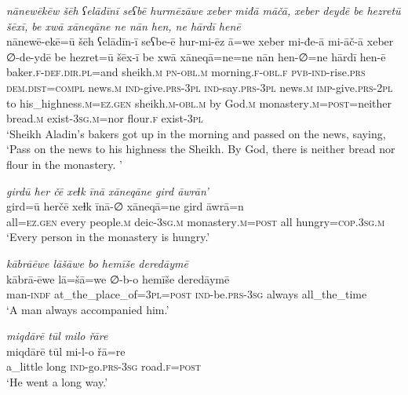 \ea \label{HB.2}
\textit{nānewēkēw šēh ʕelādīnī seʕbē hurmēzāwe xeber miđā māčā, xeber deydē be hezretū šēxī, be xwā xāneqāne ne nān hen, ne hārdī henē} \\ 
\gll nānewē-ekē=ū šēh ʕelādīn-ī seʕbe-ē hur-mi-ēz ā=we xeber mi-đe-ā mi-āč-ā xeber ∅-de-ydē be hezret=ū šēx-ī be xwā xāneqā=ne=ne nān hen-∅=ne hārdī hen-ē \\ 
 baker\textsc{\textsc{.f}}\textsc{-def}\textsc{.dir}\textsc{.pl}=and sheikh\textsc{.m} \textsc{pn}\textsc{-obl}\textsc{.m} morning\textsc{\textsc{.f}}\textsc{-obl}\textsc{\textsc{.f}} \textsc{pvb-}\textsc{ind-}rise\textsc{.prs} \textsc{dem.dist}\textsc{=compl} news\textsc{.m} \textsc{ind-}give\textsc{.prs}\textsc{-3pl} \textsc{ind-}say\textsc{.prs}\textsc{-3pl} news\textsc{.m} \textsc{imp-}give\textsc{.prs}\textsc{-2pl} to his\_highness\textsc{.m}\textsc{=ez}\textsc{.gen} sheikh\textsc{.m}\textsc{-obl}\textsc{.m} by God\textsc{.m} monastery\textsc{.m}\textsc{=\textsc{post}}=neither bread\textsc{.m} exist\textsc{-3sg}\textsc{.m}=nor flour\textsc{\textsc{.f}} exist\textsc{-3pl} \\ 
\glt `Sheikh Aladin’s bakers got up in the morning and passed on the news, saying, ‘Pass on the news to his highness the Sheikh. By God, there is neither bread nor flour in the monastery. '
\z 
 
\ea \label{HB.5}
\textit{girdū her čē xeɫk īnā xāneqāne gird āwrān’} \\ 
\gll gird=ū herčē xeɫk īnā-∅ xāneqā=ne gird āwrā=n \\ 
 all\textsc{=ez}\textsc{.gen} every people\textsc{.m} deic\textsc{-3sg}\textsc{.m} monastery\textsc{.m}\textsc{=\textsc{post}} all hungry\textsc{=cop}\textsc{.3sg}\textsc{.m} \\ 
\glt `Every person in the monastery is hungry.'
\z 
 
\ea \label{HB.7}
\textit{kābrāēwe lāšāwe bo hemīše deredāymē} \\ 
\gll kābrā-ēwe lā=šā=we ∅-b-o hemīše deredāymē \\ 
 man\textsc{-indf} at\_the\_place\_of\textsc{=3pl}\textsc{=\textsc{post}} \textsc{ind-}be\textsc{.prs}\textsc{-3sg} always all\_the\_time \\ 
\glt `A man always accompanied him.'
\z 
 
\ea \label{HB.16}
\textit{miqdārē tūl milo řāre} \\ 
\gll miqdārē tūl mi-l-o řā=re \\ 
 a\_little long \textsc{ind-}go\textsc{.prs}\textsc{-3sg} road\textsc{\textsc{.f}}\textsc{=\textsc{post}} \\ 
\glt `He went a long way.'
\z 
 
